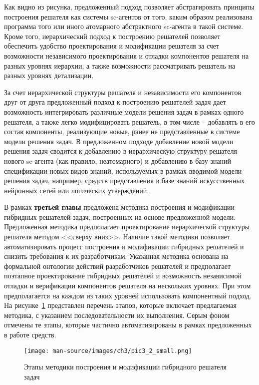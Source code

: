 \documentclass{thesisby}
\begin{document}
\vspace{-3mm}

Как видно из рисунка, предложенный подход позволяет абстрагировать принципы построения решателя как системы sc-агентов от того, каким образом реализована программа того или иного атомарного абстрактного sc-агента в такой системе. Кроме того, иерархический подход к построению решателей позволяет обеспечить удобство проектирования и модификации решателя за счет возможности независимого проектирования и отладки компонентов решателя на разных уровнях иерархии, а также возможности рассматривать решатель на разных уровнях детализации. 

За счет иерархической структуры решателя и независимости его компонентов друг от друга предложенный подход к построению решателей задач дает возможность интегрировать различные модели решения задач в рамках одного решателя, а также легко модифицировать решатель, в том числе -- добавлять в его состав компоненты, реализующие новые, ранее не представленные в системе модели решения задач. В предложенном подходе добавление новой модели решения задач сводится к добавлению в иерархическую структуру решателя нового sc-агента (как правило, неатомарного) и добавлению в базу знаний спецификации новых видов знаний, используемых в рамках вводимой модели решения задач, например, средств представления в базе знаний искусственных нейронных сетей или логических утверждений.

В рамках \textbf{третьей главы} предложена методика построения и модификации гибридных решателей задач, построенных на основе предложенной модели. Предложенная методика предполагает проектирование иерархической структуры решателя методом <<сверху вниз>>. Наличие такой методики позволяет автоматизировать процесс построения и модификации гибридных решателей и снизить требования к их разработчикам. Указанная методика основана на формальной онтологии действий разработчиков решателей и предполагает поэтапное проектирование гибридных решателей и возможность независимой отладки и верификации компонентов решателя на нескольких уровнях. При этом предполагается на каждом из таких уровней использовать компонентный подход. На рисунке~\ref{fig:pic3_2} представлен перечень этапов, которые включает предлагаемая методика, с указанием последовательности их выполнения. Серым фоном отмечены те этапы, которые частично автоматизированы в рамках предложенных в работе средств.

\begin{figure}[H]
    \centering
    \texttt{[image: man-source/images/ch3/pic3\_2\_small.png]}
    \caption{Этапы методики построения и модификации гибридного решателя задач}
    \label{fig:pic3_2}
\end{figure}
\end{document}

